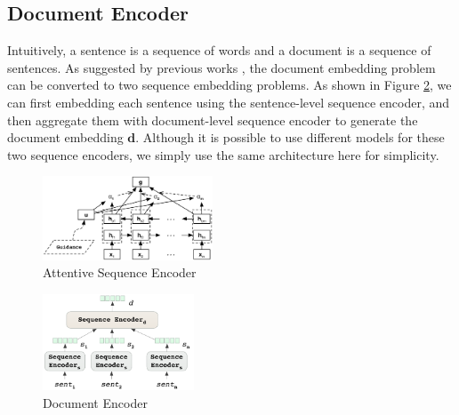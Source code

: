 \subsection{Document Encoder}
\label{sec_doc_encoder}
Intuitively, a sentence is a sequence of words and a document is a sequence of sentences. As suggested by previous works \cite{tang2015document,yang2016hierarchical}, the document embedding problem can be converted to two sequence embedding problems. As shown in Figure \ref{fig_doc_encoder}, we can first embedding each sentence using the sentence-level sequence encoder, and then aggregate them with document-level sequence encoder to generate the document embedding $\mathbf{d}$. 
Although it is possible to use different models for these two sequence encoders, we simply use the same architecture here for simplicity.

\begin{figure}[htbp]
\begin{center}
\includegraphics[width=0.45\textwidth]{figures/attentive_seq_encoder.png}	
\caption{Attentive Sequence Encoder}
\label{fig_seq_encoder}
\end{center}
\end{figure}

\begin{figure}[htbp]
\begin{center}
\includegraphics[width=0.4\textwidth]{figures/document_encoder.png}	
\caption{Document Encoder}
\label{fig_doc_encoder}
\end{center}
\end{figure}

